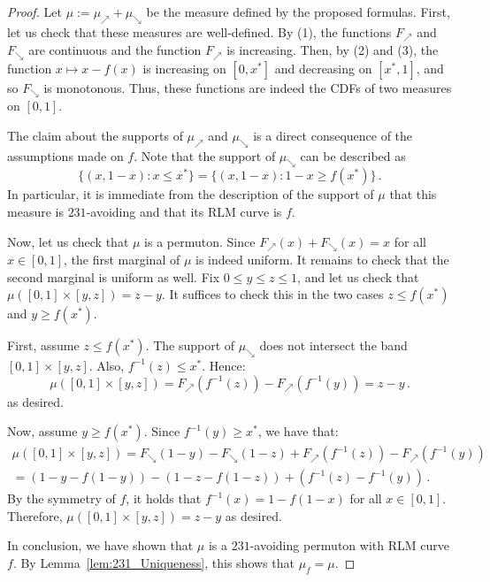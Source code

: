 \documentclass[a4paper,11pt]{amsart}
\theoremstyle{definition}
\begin{document}
\begin{proof}
    Let $\mu := \mu_\nearrow + \mu_\searrow$ be the measure defined by the proposed formulas.
    First, let us check that these measures are well-defined.
    By (1), the functions $F_\nearrow$ and $F_\searrow$ are continuous and the function $F_\nearrow$ is increasing.
    Then, by (2) and (3), the function $x\mapsto x-f(x)$ is increasing on $[0,x^*]$ and decreasing on $[x^*,1]$, and so $F_\searrow$ is monotonous.
    Thus, these functions are indeed the CDFs of two measures on $[0,1]$.

    The claim about the supports of $\mu_\nearrow$ and $\mu_\searrow$ is a direct consequence of the assumptions made on $f$.
    Note that the support of $\mu_\searrow$ can be described as
    \[ \{ (x,1-x) : x\le x^* \} = \{ (x,1-x) : 1-x\ge f(x^*)\} \,. \]
    In particular, it is immediate from the description of the support of $\mu$ that this measure is $231$-avoiding and that its RLM curve is $f$.

    Now, let us check that $\mu$ is a permuton.
    Since $F_\nearrow(x) + F_\searrow(x) = x$ for all $x\in[0,1]$, the first marginal of $\mu$ is indeed uniform.
    It remains to check that the second marginal is uniform as well.
    Fix $0\le y\le z\le 1$, and let us check that $\mu([0,1]\times[y,z]) = z-y$.
    It suffices to check this in the two cases $z\le f(x^*)$ and $y\ge f(x^*)$.

    First, assume $z\le f(x^*)$.
    The support of $\mu_\searrow$ does not intersect the band $[0,1]\times[y,z]$.
    Also, $f^{-1}(z)\le x^*$.
    Hence:
    \[
        \mu([0,1]\times[y,z]) 
        = F_\nearrow\left( f^{-1}(z) \right) - F_\nearrow\left( f^{-1}(y) \right)
        = z-y \,.
    \]
    as desired.

    Now, assume $y\ge f(x^*)$.
    Since $f^{-1}(y)\ge x^*$, we have that:
    \begin{multline*}
        \mu([0,1]\times[y,z]) 
        = F_\searrow(1-y) - F_\searrow(1-z)
        + F_\nearrow\left( f^{-1}(z) \right) - F_\nearrow\left( f^{-1}(y) \right)
        \\= ( 1-y-f(1-y) ) - ( 1-z-f(1-z) ) + ( f^{-1}(z) - f^{-1}(y) ) \,.
    \end{multline*}
    By the symmetry of $f$, it holds that $f^{-1}(x) = 1 - f(1-x)$ for all $x\in[0,1]$.
    Therefore, $\mu([0,1]\times[y,z]) = z-y$ as desired.

    In conclusion, we have shown that $\mu$ is a $231$-avoiding permuton with RLM curve $f$.
    By Lemma~\ref{lem:231_Uniqueness}, this shows that $\mu_f = \mu$.
\end{proof}
\end{document}
